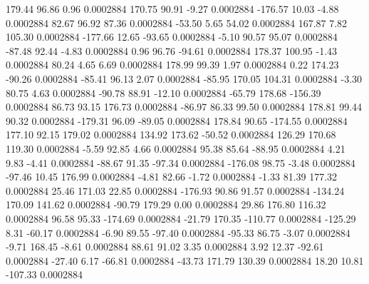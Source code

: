       179.44       96.86        0.96     0.0002884
      170.75       90.91       -9.27     0.0002884
     -176.57       10.03       -4.88     0.0002884
       82.67       96.92       87.36     0.0002884
      -53.50        5.65       54.02     0.0002884
      167.87        7.82      105.30     0.0002884
     -177.66       12.65      -93.65     0.0002884
       -5.10       90.57       95.07     0.0002884
      -87.48       92.44       -4.83     0.0002884
        0.96       96.76      -94.61     0.0002884
      178.37      100.95       -1.43     0.0002884
       80.24        4.65        6.69     0.0002884
      178.99       99.39        1.97     0.0002884
        0.22      174.23      -90.26     0.0002884
      -85.41       96.13        2.07     0.0002884
      -85.95      170.05      104.31     0.0002884
       -3.30       80.75        4.63     0.0002884
      -90.78       88.91      -12.10     0.0002884
      -65.79      178.68     -156.39     0.0002884
       86.73       93.15      176.73     0.0002884
      -86.97       86.33       99.50     0.0002884
      178.81       99.44       90.32     0.0002884
     -179.31       96.09      -89.05     0.0002884
      178.84       90.65     -174.55     0.0002884
      177.10       92.15      179.02     0.0002884
      134.92      173.62      -50.52     0.0002884
      126.29      170.68      119.30     0.0002884
       -5.59       92.85        4.66     0.0002884
       95.38       85.64      -88.95     0.0002884
        4.21        9.83       -4.41     0.0002884
      -88.67       91.35      -97.34     0.0002884
     -176.08       98.75       -3.48     0.0002884
      -97.46       10.45      176.99     0.0002884
       -4.81       82.66       -1.72     0.0002884
       -1.33       81.39      177.32     0.0002884
       25.46      171.03       22.85     0.0002884
     -176.93       90.86       91.57     0.0002884
     -134.24      170.09      141.62     0.0002884
      -90.79      179.29        0.00     0.0002884
       29.86      176.80      116.32     0.0002884
       96.58       95.33     -174.69     0.0002884
      -21.79      170.35     -110.77     0.0002884
     -125.29        8.31      -60.17     0.0002884
       -6.90       89.55      -97.40     0.0002884
      -95.33       86.75       -3.07     0.0002884
       -9.71      168.45       -8.61     0.0002884
       88.61       91.02        3.35     0.0002884
        3.92       12.37      -92.61     0.0002884
      -27.40        6.17      -66.81     0.0002884
      -43.73      171.79      130.39     0.0002884
       18.20       10.81     -107.33     0.0002884
